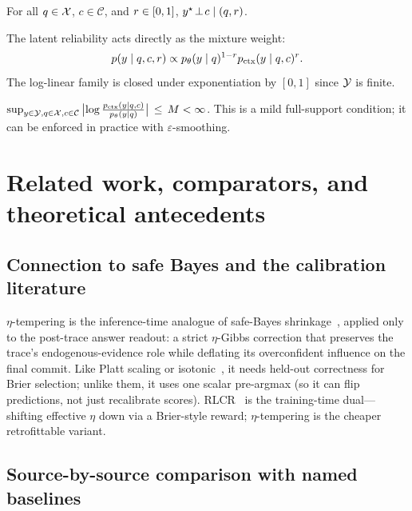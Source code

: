 \begin{assumption}
\label{app:assumption-ci}
For all $q\in\mathcal{X}$, $c\in\mathcal{C}$, and $r\in[0,1]$,
$y^\star\!\perp\! c\mid (q,r)$.
\end{assumption}

\begin{assumption}
\label{app:assumption-loglinear}
The latent reliability acts directly as the mixture weight:
\[
p(y\mid q,c,r)\propto p_\theta(y\mid q)^{1-r}p_{\mathrm{ctx}}(y\mid q,c)^{r}.
\]
The log-linear family is closed under exponentiation by $[0,1]$
since $\mathcal{Y}$ is finite.
\end{assumption}

\begin{assumption}
\label{app:assumption-bdd-llr}
$\sup_{y\in\mathcal{Y},q\in\mathcal{X},c\in\mathcal{C}}\,
\bigl|\log\frac{p_{\mathrm{ctx}}(y\mid q,c)}{p_\theta(y\mid q)}\bigr|\,\leq\,M<\infty$.
This is a mild full-support condition; it can be enforced in practice with
$\varepsilon$-smoothing.
\end{assumption}


\section{Related work, comparators, and theoretical antecedents}
\label{app:letter-B}

\subsection{Connection to safe Bayes and the calibration literature}
\label{app:safe-bayes-connection}

$\eta$-tempering is the inference-time analogue of safe-Bayes
shrinkage~\citep{grunwald2017,bissiri2016}, applied only to the
post-trace answer readout: a strict $\eta$-Gibbs correction that
preserves the trace's endogenous-evidence role while deflating its
overconfident influence on the final commit.  Like Platt scaling or
isotonic~\citep{guo2017oncalibration,naeini2015ece,platt1999,zadrozny2002isotonic},
it needs held-out correctness for Brier selection; unlike them, it
uses one scalar pre-argmax (so it can flip predictions, not just
recalibrate scores).  RLCR~\citep{damani2025rlcr} is the training-time
dual—shifting effective $\eta$ down via a Brier-style reward;
$\eta$-tempering is the cheaper retrofittable variant.


\subsection{Source-by-source comparison with named baselines}
\label{app:baseline-deep-dive}

